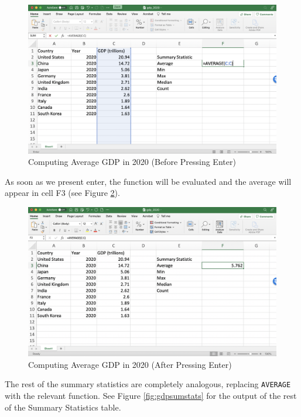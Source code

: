 \documentclass[
]{book}
\begin{document}
\begin{figure}

{\centering \includegraphics[width=0.8\linewidth]{images/01_average1} 

}

\caption{Computing Average GDP in 2020 (Before Pressing Enter)}\label{fig:average1}
\end{figure}

As soon as we present enter, the function will be evaluated and the average will appear in cell F3 (see Figure \ref{fig:average2}).

\begin{figure}

{\centering \includegraphics[width=0.8\linewidth]{images/01_average2} 

}

\caption{Computing Average GDP in 2020 (After Pressing Enter)}\label{fig:average2}
\end{figure}

The rest of the summary statistics are completely analogous, replacing \texttt{AVERAGE} with the relevant function. See Figure \ref{fig:gdpsumstats} for the output of the rest of the Summary Statistics table.
\end{document}
